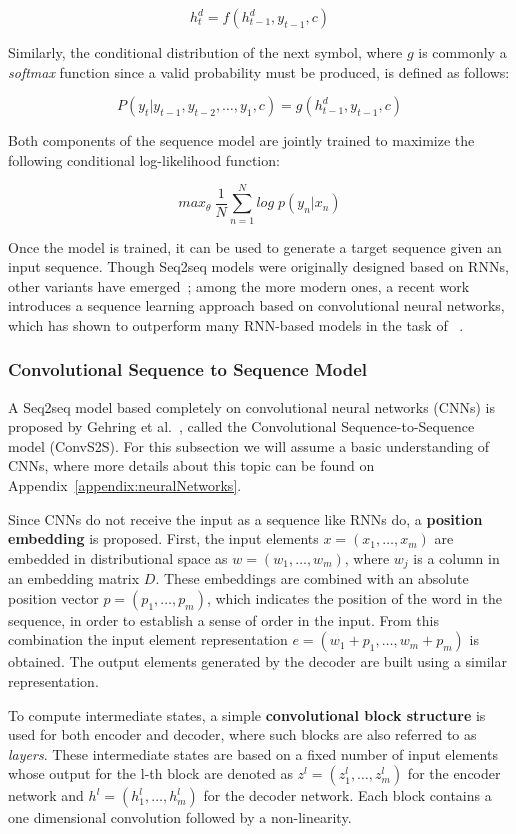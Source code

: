 \[
    h_{t}^d= f(h_{t-1}^d,y_{t-1},c)
\]

Similarly, the conditional distribution of the next symbol, where $g$ is commonly a 
\textit{softmax} function since a valid probability must be produced, is defined as follows:

\[
    P(y_t|y_{t-1},y_{t-2},\ldots,y_1,c) = g(h_{t-1}^d,y_{t-1},c)
\]

Both components of the sequence model are jointly trained to maximize the following 
conditional log-likelihood function:

\[
    max_{\theta} \: \frac{1}{N} \sum_{n=1}^N log \; p(y_n|x_n)
\]

Once the model is trained, it can be used to generate a target sequence given an input 
sequence. Though Seq2seq models were originally designed based on RNNs, other variants have 
emerged~\cite{semPar:SutskeverVL14,nmt:DongL16}; among the more modern ones, a recent work 
introduces a sequence learning approach based on convolutional neural networks, which has 
shown to outperform many RNN-based models in the task of \NLtoSPARQL~\cite{nmt:nl-to-sparql-Yin19}.

\subsubsection{Convolutional Sequence to Sequence Model}
\label{cap2:theoFrame/semPar/seq2seq/convS2S}
A Seq2seq model based completely on convolutional neural networks (CNNs) is 
proposed by Gehring et al.~\cite{nmt:convS2S-GehringAGYD17}, called the Convolutional 
Sequence-to-Sequence model (ConvS2S). For this subsection we will assume a basic 
understanding of CNNs, where more details about this topic can be found on 
Appendix~\ref{appendix:neuralNetworks}.

Since CNNs do not receive the input as a sequence like RNNs do, a \textbf{position embedding} 
is proposed. First, the input elements $x=(x_1,\ldots,x_m)$ are embedded in distributional 
space as $w=(w_1,\ldots,w_m)$, where $w_j$ is a column in an embedding matrix $D$. These 
embeddings are combined with an absolute position vector $p=(p_1,\ldots, p_m)$, which 
indicates the position of the word in the sequence, in order to establish a sense of order in 
the input. From this combination the input element representation $e=(w_1+p_1,\ldots, w_m+p_m)$ 
is obtained. The output elements generated by the decoder are built using a similar 
representation.

To compute intermediate states, a simple \textbf{convolutional block structure} is used for both 
encoder and decoder, where such blocks are also referred to as \textit{layers}. These intermediate 
states are based on a fixed number of input elements whose output for the l-th block are 
denoted as $z^l=(z_1^l,\ldots,z_m^l)$ for the encoder network and $h^l=(h_1^l,\ldots,h_m^l)$ 
for the decoder network. Each block contains a one dimensional convolution followed by a 
non-linearity.

